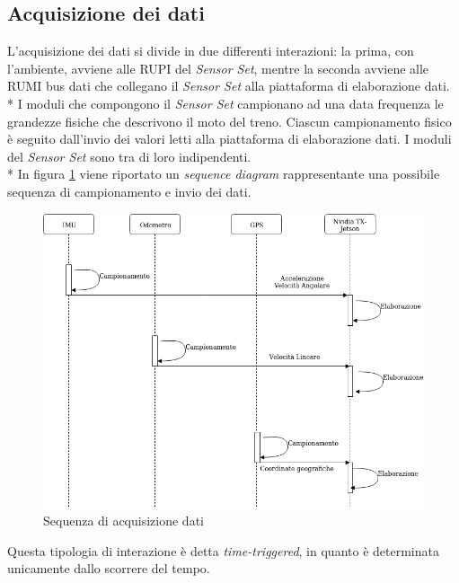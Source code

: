 	\subsection{Acquisizione dei dati}
	L'acquisizione dei dati si divide in due differenti interazioni: la prima, con l'ambiente, avviene alle RUPI del \emph{Sensor Set}, mentre la seconda avviene alle RUMI bus dati che collegano il \emph{Sensor Set} alla piattaforma di elaborazione dati.\\*
	I moduli che compongono il \emph{Sensor Set} campionano ad una data frequenza le grandezze fisiche che descrivono il moto del treno. Ciascun campionamento fisico \`e seguito dall'invio dei valori letti alla piattaforma di elaborazione dati. I moduli del \emph{Sensor Set} sono tra di loro indipendenti.\\* 
	In figura \ref{fig:seqdiag} viene riportato un \emph{sequence diagram} rappresentante una possibile sequenza di campionamento e invio dei dati.\newpage	\begin{figure}[h]
		\centering
		\includegraphics[width=0.7\linewidth]{img/seqdiag}
		\caption{Sequenza di acquisizione dati}
		\label{fig:seqdiag}
	\end{figure}
	Questa tipologia di interazione \`e detta \emph{time-triggered}, in quanto \`e determinata unicamente dallo scorrere del tempo. \cite{timetriggered}
